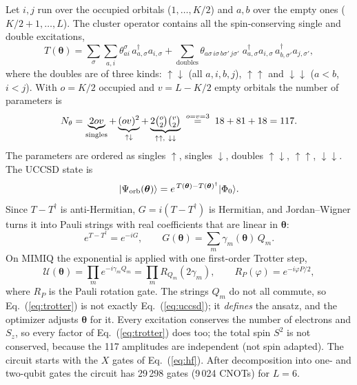 \documentclass[11pt,a4paper]{article}
\newcommand{\ad}{a^\dagger}
\newcommand{\up}{\uparrow}
\newcommand{\dn}{\downarrow}
\begin{document}
Let $i,j$ run over the occupied orbitals ($1, \dots, K/2$) and $a,b$ over the
empty ones ($K/2+1, \dots, L$). The cluster operator contains all the
spin-conserving single and double excitations,
\begin{equation}\label{eq:T}
  T(\boldsymbol\theta) = \sum_{\sigma} \sum_{a,i} \theta^{\sigma}_{ai}\, \ad_{a,\sigma} a_{i,\sigma}
  + \sum_{\text{doubles}} \theta_{a\sigma\, i\sigma\, b\sigma'\, j\sigma'}\;
    \ad_{a,\sigma} a_{i,\sigma}\, \ad_{b,\sigma'} a_{j,\sigma'} ,
\end{equation}
where the doubles are of three kinds: $\up\dn$ (all $a,i,b,j$), $\up\up$ and
$\dn\dn$ ($a<b$, $i<j$). With $o = K/2$ occupied and $v = L - K/2$ empty orbitals
the number of parameters is
\begin{equation}\label{eq:npar}
  N_\theta = \underbrace{2ov}_{\text{singles}}
           + \underbrace{(ov)^2}_{\up\dn}
           + \underbrace{2\tbinom{o}{2}\tbinom{v}{2}}_{\up\up,\ \dn\dn}
  \;\stackrel{o=v=3}{=}\; 18 + 81 + 18 = 117 .
\end{equation}
The parameters are ordered as singles $\up$, singles $\dn$, doubles $\up\dn$,
$\up\up$, $\dn\dn$. The UCCSD state is
\begin{equation}\label{eq:uccsd}
  |\Psi_{\rm orb}(\boldsymbol\theta)\rangle
  = e^{\,T(\boldsymbol\theta) - T(\boldsymbol\theta)^\dagger} |\Phi_0\rangle .
\end{equation}
Since $T - T^\dagger$ is anti-Hermitian, $G = i(T - T^\dagger)$ is Hermitian, and
Jordan--Wigner turns it into Pauli strings with real coefficients that are
linear in $\boldsymbol\theta$:
\begin{equation}\label{eq:G}
  e^{T - T^\dagger} = e^{-iG} , \qquad
  G(\boldsymbol\theta) = \sum_m \gamma_m(\boldsymbol\theta)\, Q_m .
\end{equation}
On MIMIQ the exponential is applied with one first-order Trotter step,
\begin{equation}\label{eq:trotter}
  \mathcal{U}(\boldsymbol\theta) = \prod_m e^{-i \gamma_m Q_m} = \prod_m R_{Q_m}(2 \gamma_m) ,
  \qquad R_P(\varphi) = e^{-i\varphi P/2} ,
\end{equation}
where $R_P$ is the Pauli rotation gate. The strings $Q_m$ do not all
commute, so Eq.~(\ref{eq:trotter}) is not exactly Eq.~(\ref{eq:uccsd}); it
\emph{defines} the ansatz, and the optimizer adjusts
$\boldsymbol\theta$ for it. Every excitation conserves the number of electrons
and $S_z$, so every factor of Eq.~(\ref{eq:trotter}) does too; the total spin
$S^2$ is not conserved, because the 117 amplitudes are independent (not spin
adapted). The circuit starts with the $X$ gates of Eq.~(\ref{eq:hf}). After decomposition into
one- and two-qubit gates the circuit has 29\,298 gates (9\,024 CNOTs) for
$L = 6$.
\end{document}
